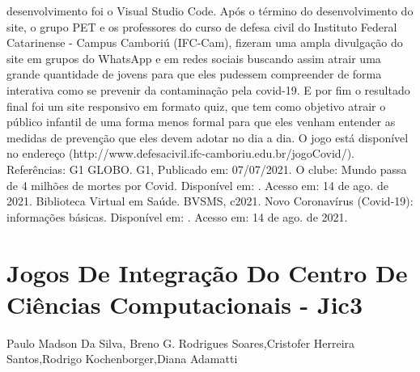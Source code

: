 desenvolvimento foi o Visual Studio Code.
Após o término do desenvolvimento do site, o grupo PET e os professores do curso de 
defesa civil do Instituto Federal Catarinense - Campus Camboriú (IFC-Cam), fizeram uma ampla 
divulgação do site em grupos do WhatsApp e em redes sociais buscando assim atrair uma grande 
quantidade de jovens para que eles pudessem compreender de forma interativa como se prevenir 
da contaminação pela covid-19. 
E por fim o resultado final foi um site responsivo em formato quiz, que tem como objetivo 
atrair o público infantil de uma forma menos formal para que eles venham entender as medidas de 
prevenção que eles devem adotar no dia a dia. O jogo está disponível no endereço 
(http://www.defesacivil.ifc-camboriu.edu.br/jogoCovid/).
Referências:
G1 GLOBO. G1, Publicado em: 07/07/2021. O clube: Mundo passa de 4 milhões de mortes por Covid. 
Disponível em: . Acesso em: 14 de ago. de 2021.
Biblioteca Virtual em Saúde. BVSMS, c2021. Novo Coronavírus (Covid-19): informações básicas. 
Disponível em: . Acesso 
em: 14 de ago. de 2021.




\section*{Jogos De Integração Do Centro De Ciências Computacionais - Jic3}

Paulo Madson Da Silva, Breno G. Rodrigues Soares,Cristofer Herreira Santos,Rodrigo Kochenborger,Diana Adamatti

